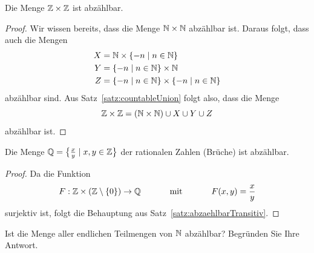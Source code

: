 \begin{cor}
Die Menge $\mathbb{Z}\times \mathbb{Z}$ ist abzählbar.
\end{cor}
\begin{proof}
Wir wissen bereits, dass die Menge $\mathbb{N}\times\mathbb{N}$ abzählbar ist. Daraus folgt, dass auch die Mengen
\begin{align*}
X&=\mathbb{N}\times\{-n\mid n\in \mathbb{N}\}\\
Y&=\{-n\mid n\in \mathbb{N}\}\times\mathbb{N} \\
Z&=\{-n\mid n\in \mathbb{N}\}\times\{-n\mid n\in \mathbb{N}\}
\end{align*}
abzählbar sind. Aus Satz~\ref{satz:countableUnion} folgt also, dass die Menge
\[
\mathbb{Z}\times\mathbb{Z}=(\mathbb{N}\times\mathbb{N})\cup X\cup Y\cup Z
\]
abzählbar ist.
\end{proof}

\begin{cor}
Die Menge $\mathbb{Q}=\big\{\frac{x}{y}\mid x,y\in \mathbb{Z}\big\}$ der rationalen Zahlen (Brüche) ist abzählbar.
\end{cor}
\begin{proof}
Da die Funktion
\[
F:\mathbb{Z}\times(\mathbb{Z}\setminus{\{0\}})\to \mathbb{Q}\phantom{abstand}\text{mit}\phantom{abstand}F(x,y)=\frac{x}{y}
\]
surjektiv ist, folgt die Behauptung aus Satz~\ref{satz:abzaehlbarTransitiv}.
\end{proof}

\begin{ueb}
Ist die Menge aller endlichen Teilmengen von $\mathbb{N}$ abzählbar? Begründen Sie Ihre Antwort.
\end{ueb}
\begin{lsg}
\end{lsg}

